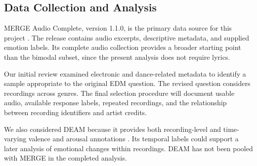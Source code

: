 \subsection{Data Collection and Analysis}
\label{sec:selection}

MERGE Audio Complete, version 1.1.0, is the primary data source for this project \cite{mergedata}. The release contains audio excerpts, descriptive metadata, and supplied emotion labels. Its complete audio collection provides a broader starting point than the bimodal subset, since the present analysis does not require lyrics.

Our initial review examined electronic and dance-related metadata to identify a sample appropriate to the original EDM question. The revised question considers recordings across genres. The final selection procedure will document usable audio, available response labels, repeated recordings, and the relationship between recording identifiers and artist credits.

We also considered DEAM because it provides both recording-level and time-varying valence and arousal annotations \cite{deamdataset}. Its temporal labels could support a later analysis of emotional changes within recordings. DEAM has not been pooled with MERGE in the completed analysis.
